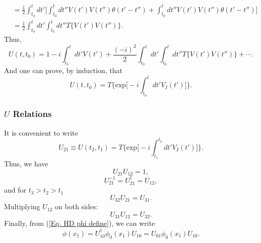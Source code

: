 \documentclass[11pt]{article}
\theoremstyle{definition}
\begin{document}
\begin{tcolorbox}[breakable, colback=yellow!20!white, colframe=black, boxrule=1pt]
\begin{equation}
\begin{aligned}
             &= \frac{1}{2}  \int^t_{t_0} dt'\biggr[\int^{t}_{t_0} dt''V(t')V(t'')\theta(t'-t'') + \int^{t}_{t_0} dt''V(t')V(t'')\theta(t'-t'') \biggr]\\
             &= \frac{1}{2}  \int^t_{t_0} dt'\int^{t}_{t_0} dt'' T\{V(t')V(t'')\}.
        \end{aligned}
    \end{equation}
    Thus,
    \begin{equation}
        U(t,t_0) = 1 - i\int^t_{t_0} dt' V(t') + \frac{(-i)^2}{2}  \int^t_{t_0} dt'\int^{t}_{t_0} dt'' T\{V(t')V(t'')\} + \cdots.
    \end{equation}
    And one can prove, by induction, that
    \begin{equation}
        U(t, t_0) = T\biggr\{\text{exp}\biggr[-i\int^t_{t_0} dt' V_I(t')\biggr]\biggr\}.
    \end{equation}
    
\end{tcolorbox}
\subsubsection{$U$ Relations}
It is convenient to write
\begin{equation}
    U_{21} \equiv U(t_2, t_1) = T\biggr\{\text{exp}\biggr[-i\int^{t_2}_{t_1} dt' V_I(t')\biggr]\biggr\}.
\end{equation}
Thus, we have
\begin{equation}
    U_{21}U_{12} = 1,
\end{equation}
\begin{equation}
    U_{21}^{-1} = U_{21}^\dagger = U_{12},
\end{equation}
and for $t_3 > t_2 > t_1$
\begin{equation}
    U_{32}U_{21} = U_{31}.
\end{equation}
Multiplying $U_{12}$ on both sides:
\begin{equation}
    U_{31}U_{12} = U_{32}.
\end{equation}
Finally, from (\ref{Eq. HD phi define}), we can write
\begin{equation}
    \phi(x_1) = U_{10}^\dagger\phi_0(x_1)U_{10} = U_{01}\phi_0(x_1)U_{10}.
\end{equation}
\end{document}
